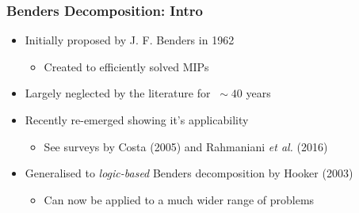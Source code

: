 \documentclass{beamer}
\begin{document}
\begin{frame}
\frametitle{Benders Decomposition: Intro}
\begin{itemize}
	\item Initially proposed by J. F. Benders in 1962\vspace{1mm}
	\begin{itemize}
		\item Created to efficiently solved MIPs\vspace{3mm}\pause
	\end{itemize}
	\item Largely neglected by the literature for $\:\sim40$ years\vspace{3mm}\pause
	\item Recently re-emerged showing it's applicability\vspace{1mm}
	\begin{itemize}
		\item See surveys by Costa (2005) and Rahmaniani \emph{et al.} (2016)\vspace{3mm}\pause
	\end{itemize}
	\item Generalised to \emph{logic-based} Benders decomposition by Hooker (2003)\vspace{1mm}
	\begin{itemize}
		\item Can now be applied to a much wider range of problems
	\end{itemize}
\end{itemize}
\end{frame}
\end{document}
